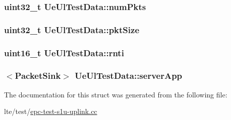 \subsubsection[{\texorpdfstring{num\+Pkts}{numPkts}}]{\setlength{\rightskip}{0pt plus 5cm}uint32\+\_\+t Ue\+Ul\+Test\+Data\+::num\+Pkts}\hypertarget{structUeUlTestData_a44011418eb9db19dba6d443d865fbc20}{}\label{structUeUlTestData_a44011418eb9db19dba6d443d865fbc20}
\subsubsection[{\texorpdfstring{pkt\+Size}{pktSize}}]{\setlength{\rightskip}{0pt plus 5cm}uint32\+\_\+t Ue\+Ul\+Test\+Data\+::pkt\+Size}\hypertarget{structUeUlTestData_a6d8b90a611f50a25aabfa94c21ab2b2a}{}\label{structUeUlTestData_a6d8b90a611f50a25aabfa94c21ab2b2a}
\subsubsection[{\texorpdfstring{rnti}{rnti}}]{\setlength{\rightskip}{0pt plus 5cm}uint16\+\_\+t Ue\+Ul\+Test\+Data\+::rnti}\hypertarget{structUeUlTestData_a666e0a1106040b243821e9a4368aae26}{}\label{structUeUlTestData_a666e0a1106040b243821e9a4368aae26}
\subsubsection[{\texorpdfstring{server\+App}{serverApp}}]{$<${\bf Packet\+Sink}$>$ Ue\+Ul\+Test\+Data\+::server\+App}\hypertarget{structUeUlTestData_a8debbb4e9dfd2b4be4aa2c48fb54852d}{}\label{structUeUlTestData_a8debbb4e9dfd2b4be4aa2c48fb54852d}


The documentation for this struct was generated from the following file\+:\begin{DoxyCompactItemize}
\item 
lte/test/\hyperlink{epc-test-s1u-uplink_8cc}{epc-\/test-\/s1u-\/uplink.\+cc}\end{DoxyCompactItemize}
